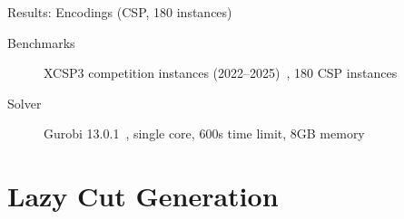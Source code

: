 \documentclass[aspectratio=169]{beamer}
\begin{document}
\begin{frame}{Results: Encodings (CSP, 180 instances)}

\begin{description}
    \item[Benchmarks] XCSP3 competition instances (2022--2025)~\cite{audemard2025proceedings2025xcsp3competition}, 180 CSP instances
    \item[Solver] Gurobi 13.0.1~\cite{gurobi}, single core, 600s time limit, 8GB memory
\end{description}

\vfill

\centering
\small
{}

\resultlegend
\end{frame}

\section{Lazy Cut Generation}
\end{document}
